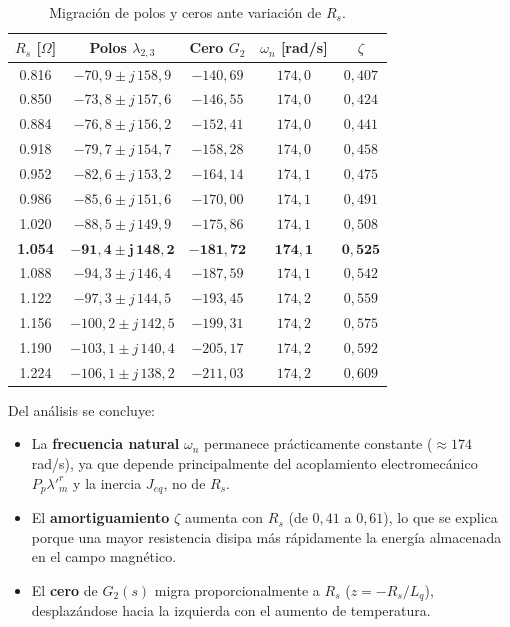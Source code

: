 \documentclass[12pt, a4paper,journal, onecolumn, compsoc]{IEEEtran}
\begin{document}
\begin{table}[H]
\centering
\caption{Migración de polos y ceros ante variación de $R_s$.}
\label{tab:migracion_Rs}
\renewcommand{\arraystretch}{1.2}
\footnotesize
\begin{tabular}{|c|c|c|c|c|}
\hline
$R_s$ [$\Omega$] & Polos $\lambda_{2,3}$ & Cero $G_2$ & $\omega_n$ [rad/s] & $\zeta$ \\
\hline
0.816 & $-70{,}9 \pm j\,158{,}9$ & $-140{,}69$ & $174{,}0$ & $0{,}407$ \\
0.850 & $-73{,}8 \pm j\,157{,}6$ & $-146{,}55$ & $174{,}0$ & $0{,}424$ \\
0.884 & $-76{,}8 \pm j\,156{,}2$ & $-152{,}41$ & $174{,}0$ & $0{,}441$ \\
0.918 & $-79{,}7 \pm j\,154{,}7$ & $-158{,}28$ & $174{,}0$ & $0{,}458$ \\
0.952 & $-82{,}6 \pm j\,153{,}2$ & $-164{,}14$ & $174{,}1$ & $0{,}475$ \\
0.986 & $-85{,}6 \pm j\,151{,}6$ & $-170{,}00$ & $174{,}1$ & $0{,}491$ \\
1.020 & $-88{,}5 \pm j\,149{,}9$ & $-175{,}86$ & $174{,}1$ & $0{,}508$ \\
\textbf{1.054} & $\mathbf{-91{,}4 \pm j\,148{,}2}$ & $\mathbf{-181{,}72}$ & $\mathbf{174{,}1}$ & $\mathbf{0{,}525}$ \\
1.088 & $-94{,}3 \pm j\,146{,}4$ & $-187{,}59$ & $174{,}1$ & $0{,}542$ \\
1.122 & $-97{,}3 \pm j\,144{,}5$ & $-193{,}45$ & $174{,}2$ & $0{,}559$ \\
1.156 & $-100{,}2 \pm j\,142{,}5$ & $-199{,}31$ & $174{,}2$ & $0{,}575$ \\
1.190 & $-103{,}1 \pm j\,140{,}4$ & $-205{,}17$ & $174{,}2$ & $0{,}592$ \\
1.224 & $-106{,}1 \pm j\,138{,}2$ & $-211{,}03$ & $174{,}2$ & $0{,}609$ \\
\hline
\end{tabular}
\end{table}

Del análisis se concluye:
\begin{itemize}
    \item La \textbf{frecuencia natural} $\omega_n$ permanece prácticamente constante ($\approx 174$ rad/s), ya que depende principalmente del acoplamiento electromecánico $P_p\lambda'^r_m$ y la inercia $J_{eq}$, no de $R_s$.
    \item El \textbf{amortiguamiento} $\zeta$ aumenta con $R_s$ (de $0{,}41$ a $0{,}61$), lo que se explica porque una mayor resistencia disipa más rápidamente la energía almacenada en el campo magnético.
    \item El \textbf{cero} de $G_2(s)$ migra proporcionalmente a $R_s$ ($z = -R_s/L_q$), desplazándose hacia la izquierda con el aumento de temperatura.
\end{itemize}
\end{document}
